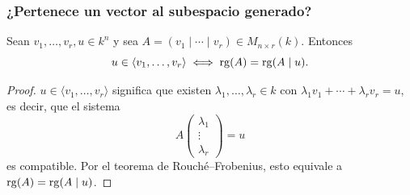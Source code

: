 \begin{frame}
    \frametitle{¿Pertenece un vector al subespacio generado?}

    \begin{proposition}
        Sean $v_1,\ldots,v_r,u\in k^n$ y sea
        $A=(v_1\mid\cdots\mid v_r)\in M_{n\times r}(k)$. Entonces
        \[
            u\in\langle v_1,\ldots,v_r\rangle
            \iff
            \operatorname{rg}(A)=\operatorname{rg}(A\mid u).
        \]
    \end{proposition}

    \begin{proof}
        $u\in\langle v_1,\ldots,v_r\rangle$ significa que existen
        $\lambda_1,\ldots,\lambda_r\in k$ con
        $\lambda_1v_1+\cdots+\lambda_rv_r=u$, es decir, que el sistema
        \[
            A\begin{pmatrix}\lambda_1\\\vdots\\\lambda_r\end{pmatrix}=u
        \]
        es compatible. Por el teorema de Rouché--Frobenius, esto equivale
        a $\operatorname{rg}(A)=\operatorname{rg}(A\mid u)$.
    \end{proof}
\end{frame}

